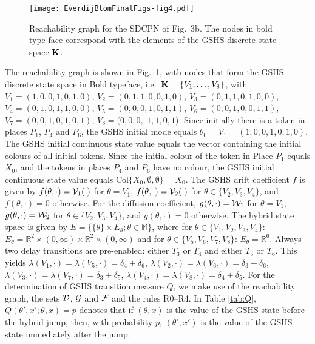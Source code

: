 \documentclass[copyright,creativecommons]{eptcs}
\begin{document}
\begin{figure}[h!bt]
\begin{center}
\texttt{[image: EverdijBlomFinalFigs-fig4.pdf]}
\end{center}
\caption{Reachability graph for the SDCPN of Fig.\ 3b.
The nodes in bold type face correspond with
the elements of the GSHS discrete state space ${\bf K}$.}
\label{fig:RGexample}
\end{figure}



The reachability graph is shown in Fig.\ \ref{fig:RGexample}, with
nodes that form the GSHS discrete state space in Bold typeface,
i.e.\ ${\bf K} = \{V_1, \ldots, V_8\}$, with
$V_1=(1,0,0,1,0,1,0)$, $V_2=(0,1,1,0,0,1,0)$,
$V_3=(0,1,1,0,1,0,0)$, $V_4=(0,1,0,1,1,0,0)$,
$V_5=(0,0,0,1,0,1,1)$, $V_6=(0,0,1,0,0,1,1)$,
$V_7=(0,0,1,0,1,0,1)$, $V_8=(0,0,0,$ $1,1,0,1)$. Since initially
there is a token in places $P_1$, $P_4$ and $P_6$, the GSHS
initial mode equals $\theta_0 = V_1 = (1,0,0,1,0,1,0)$. The GSHS
initial continuous state value equals the vector containing the
initial colours of all initial tokens. Since the initial colour of
the token in Place $P_1$ equals $X_0$, and the tokens in places
$P_4$ and $P_6$ have no colour, the GSHS initial continuous state
value equals Col$\{X_0, \emptyset, \emptyset\} = X_0$. The GSHS
drift coefficient $f$ is given by $f(\theta,\cdot)={\cal
V}_1(\cdot)$ for $\theta=V_1$, $f(\theta,\cdot) ={\cal
V}_2(\cdot)$ for $\theta \in \{V_2, V_3, V_4\}$, and
$f(\theta,\cdot)=0$ otherwise. For the diffusion coefficient,
$g(\theta,\cdot)={\cal W}_1$ for $\theta=V_1$,
$g(\theta,\cdot)={\cal W}_2$ for $\theta \in \{V_2, V_3, V_4\}$,
and $g(\theta,\cdot)=0$ otherwise. The hybrid state space is given
by $E = \{\{\theta\} \times E_{\theta} ; \theta \in \mathbb{M}\}$,
where for $\theta \in \{ V_1, V_2, V_3, V_4\}$: $E_{\theta} =
\mathbb{R}^2 \times (0,\infty) \times \mathbb{R}^2 \times
(0,\infty)$ and for $\theta \in \{ V_5, V_6, V_7, V_8\}$:
$E_{\theta} = \mathbb{R}^6$. Always two delay transitions are
pre-enabled: either $T_3$ or $T_4$ and either $T_5$ or $T_6$. This
yields $\lambda(V_1, \cdot) = \lambda(V_5, \cdot) = \delta_4 +
\delta_6$, $\lambda(V_2, \cdot) = \lambda(V_6, \cdot) = \delta_3 +
\delta_6$, $\lambda(V_3, \cdot) = \lambda(V_7, \cdot) = \delta_3 +
\delta_5$, $\lambda(V_4, \cdot) = \lambda(V_8, \cdot) = \delta_4 +
\delta_5$. For the determination of GSHS transition measure $Q$, we make
use of the reachability graph, the sets ${\cal D}$, ${\cal G}$ and
${\cal F}$ and the rules R0--R4. In Table \ref{tab:Q},
$Q(\theta',x'; \theta,x)=p$ denotes that if $(\theta,x)$ is the
value of the GSHS state before the hybrid jump, then, with
probability $p$, $(\theta',x')$ is the value of the GSHS state
immediately after the jump.
\end{document}
